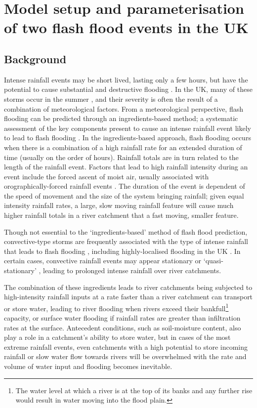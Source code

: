 \chapter{Model setup and parameterisation of two flash flood events in the UK}
\label{chapter_events}

\section{Background}
Intense rainfall events may be short lived, lasting only a few hours, but have the potential to cause substantial and destructive flooding \citep{lane2008climate,pitt2008pitt}. In the UK, many of these storms occur in the summer \citep{Kendon2014}, and their severity is often the result of a combination of meteorological factors. From a meteorological perspective, flash flooding can be predicted through an ingredients-based method; a systematic assessment of the key components present to cause an intense rainfall event likely to lead to flash flooding \citep{Doswell1996}. In the ingredients-based approach, flash flooding occurs when there is a combination of a high rainfall rate for an extended duration of time (usually on the order of hours). Rainfall totals are in turn related to the length of the rainfall event. Factors that lead to high rainfall intensity during an event include the forced ascent of moist air, usually associated with orographically-forced rainfall events \citep{Barros1994,Houze2012}. The duration of the event is dependent of the speed of movement and the size of the system bringing rainfall; given equal intensity rainfall rates, a large, slow moving rainfall feature will cause much higher rainfall totals in a river catchment that a fast moving, smaller feature. 

Though not essential to the `ingredients-based' method of flash flood prediction, convective-type storms are frequently associated with the type of intense rainfall that leads to flash flooding \citep{doswell1993flash}, including highly-localised flooding in the UK \citep{gray1998mesoscale,Browning2007}. In certain cases, convective rainfall events may appear stationary or `quasi-stationary' \citep{chappell1986quasi,warren2014boscastle}, leading to prolonged intense rainfall over river catchments.

The combination of these ingredients leads to river catchments being subjected to high-intensity rainfall inputs at a rate faster than a river catchment can transport or store water, leading to river flooding when rivers exceed their bankfull\footnote{The water level at which a river is at the top of its banks and any further rise would result in water moving into the flood plain.} capacity, or surface water flooding if rainfall rates are greater than infiltration rates at the surface. Antecedent conditions, such as soil-moisture content, also play a role in a catchment's ability to store water, but in cases of the most extreme rainfall events, even catchments with a high potential to store incoming rainfall or slow water flow towards rivers will be overwhelmed with the rate and volume of water input and flooding becomes inevitable.

